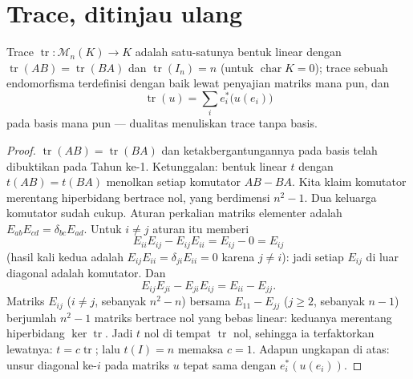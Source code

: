 \section{Trace, ditinjau ulang}

\begin{proposition}\label{prop:b2:linalg:trace}
Trace $\operatorname{tr} \colon \mathcal{M}_n(K) \to K$ adalah
satu-satunya bentuk linear dengan $\operatorname{tr}(AB) =
\operatorname{tr}(BA)$ dan $\operatorname{tr}(I_n) = n$ (untuk
$\operatorname{char} K = 0$); trace sebuah endomorfisma
terdefinisi dengan baik lewat penyajian matriks mana pun, dan
\[
\operatorname{tr}(u) = \sum_{i} e_i^*\bigl(u(e_i)\bigr)
\]
pada basis mana pun --- dualitas menuliskan trace tanpa basis.
\end{proposition}

\begin{proof}
$\operatorname{tr}(AB) = \operatorname{tr}(BA)$ dan ketakbergantungannya
pada basis telah dibuktikan pada Tahun ke-1. Ketunggalan: bentuk linear
$t$ dengan $t(AB) = t(BA)$ menolkan setiap komutator $AB - BA$. Kita
klaim komutator merentang hiperbidang bertrace nol, yang berdimensi
$n^2 - 1$. Dua keluarga komutator sudah cukup. Aturan perkalian
matriks elementer adalah $E_{ab}E_{cd} = \delta_{bc}E_{ad}$. Untuk
$i \neq j$ aturan itu memberi
\[
E_{ii}E_{ij} - E_{ij}E_{ii} = E_{ij} - 0 = E_{ij}
\]
(hasil kali kedua adalah $E_{ij}E_{ii} = \delta_{ji}E_{ii} = 0$
karena $j \neq i$): jadi setiap $E_{ij}$ di luar diagonal adalah
komutator. Dan
\[
E_{ij}E_{ji} - E_{ji}E_{ij} = E_{ii} - E_{jj} .
\]
Matriks $E_{ij}$ ($i \neq j$, sebanyak $n^2 - n$) bersama
$E_{11} - E_{jj}$ ($j \geq 2$, sebanyak $n - 1$) berjumlah $n^2 - 1$
matriks bertrace nol yang bebas linear: keduanya merentang
hiperbidang $\ker\operatorname{tr}$. Jadi $t$ nol di tempat
$\operatorname{tr}$ nol, sehingga ia terfaktorkan lewatnya: $t =
c\operatorname{tr}$; lalu $t(I) = n$ memaksa $c = 1$. Adapun ungkapan
di atas: unsur diagonal ke-$i$ pada matriks $u$ tepat sama dengan
$e_i^*(u(e_i))$.
\end{proof}

